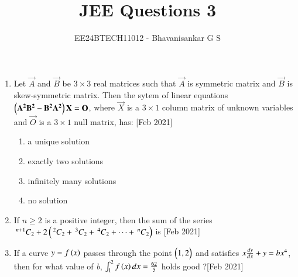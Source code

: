 \documentclass[journal,12pt,onecolumn]{IEEEtran}
\newcommand{\nCr}[2]{\,^{#1}C_{#2}}
\theoremstyle{remark}
\begin{document}

\vspace{3cm}

\title{JEE Questions 3}
\author{EE24BTECH11012 - Bhavanisankar G S}
\maketitle
\newpage
\bigskip

\renewcommand{\thefigure}{\theenumi}
\renewcommand{\thetable}{\theenumi}
\begin{enumerate}
	\item Let $\vec{A}$ and $\vec{B}$ be $3 \times 3$ real matrices such that $\vec{A}$ is symmetric matrix and $\vec{B}$ is skew-symmetric matrix. Then the sytem of linear equations $\left(\mathbf{A^2B^2 - B^2A^2}\right)\mathbf{X} = \mathbf{O}$, where $\vec{X}$ is a $3 \times 1$ column matrix of unknown variables and $\vec{O}$ is a $3 \times 1$ null matrix, has: \hfill{[Feb 2021]} 
		\begin{enumerate}
			\item a unique solution
			\item exactly two solutions
			\item infinitely many solutions
			\item no solution
		\end{enumerate}
	\item If $ n\geq2 $ is a positive integer, then the sum of the series $\nCr{n+1}{2} + 2\brak{\nCr{2}{2} + \nCr{3}{2} + \nCr{4}{2} + \dots + \nCr{n}{2}}$ is \hfill{[Feb 2021]}
		\begin{enumerate}
		\end{enumerate}
	\item If a curve $ y = f\left(x\right) $ passes through the point $\begin{pmatrix}1,2\end{pmatrix}$ and satisfies $ x\frac{dy}{dx} + y = \emph{b}x^4 $, then for what value of \emph{b}, $ \int_{1}^{2} f\left(x\right) dx = \frac{62}{5} $ holds good ?\hfill{[Feb 2021]}
		\begin{enumerate}
				\begin{multicols}{4}
			\item 5

\end{multicols}
\end{enumerate}
\end{enumerate}
\end{document}
